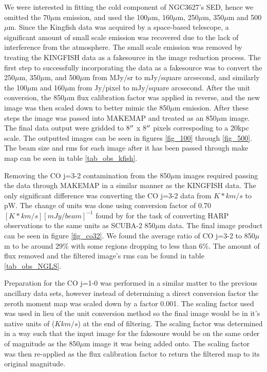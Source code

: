 We were interested in fitting the cold component of NGC3627's SED, hence we omitted the 70$\mu$m emission, and used the 100$\mu$m, 160$\mu$m, 250$\mu$m, 350$\mu$m and 500$\mu$m.  Since the Kingfish data was acquired by a space-based telescope, a significant amount of small scale emission was recovered due to the lack of interference from the atmosphere.  The small scale emission was removed by treating the KINGFISH data as a fakesource in the image reduction process.  The first step to successfully incorporating the data as a fakesource was to convert the 250$\mu$m, 350$\mu$m, and 500$\mu$m from MJy/sr to mJy/square arcsecond, and similarly the 100$\mu$m and 160$\mu$m from Jy/pixel to mJy/square arcsecond.   After the unit conversion, the 850$\mu$m flux calibration factor was applied in reverse, and the new image was then scaled down to better mimic the 850$\mu$m emission.  After these steps the image was passed into MAKEMAP and treated as an 850$\mu$m image.  The final data output were gridded to 8$\mbox{$^{\prime\prime}$}$ x 8$\mbox{$^{\prime\prime}$}$ pixels correspoding to a 20kpc scale.  The outputted images can be seen in figures \ref{fig_100} through \ref{fig_500}.  The beam size and rms for each image after it has been passed through make map can be seen in table \ref{tab_obs_kfish}.

Removing the CO j=3-2 contamination from the 850$\mu$m images required passing the data through MAKEMAP in a similar manner as the KINGFISH data.  The only significant difference was converting the CO j=3-2 data from $K*km/s$ to pW.  The change of units was done using conversion factor of 0.70 $[K*km/s][mJy/beam]^{-1}$ found by \citep{drabek2012} for the task of converting HARP observations to the same units as SCUBA-2 850$\mu$m data.  The final image product can be seen in figure \ref{fig_co32}.  We found the average ratio of CO j=3-2 to 850$\mu$m to be around 29\% with some regions dropping to less than 6\%.  The amount of flux removed and the filtered image's rms can be found in table \ref{tab_obs_NGLS}.

Preparation for the CO j=1-0 was performed in a similar matter to the previous ancillary data sets, however instead of determining a direct conversion factor the zeroth moment map was scaled down by a factor 0.001.  The scaling factor used was used in lieu of the unit conversion method so the final image would be in it's native units of ($K km/s$) at the end of filtering.  The scaling factor was determined in a way such that the input image for the fakesoure would be on the same order of magnitude as the 850$\mu$m image it was being added onto.  The scaling factor was then re-applied as the flux calibration factor to return the filtered map to its original magnitude.

